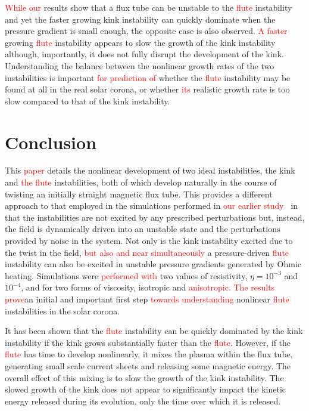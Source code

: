 \documentclass[12pt]{article}
\newcommand{\rs}[2]{\textcolor{red}{#2}}
\begin{document}
\rs{These}{While our} results show that a flux tube can be unstable to
the \rs{fluting}{flute} instability and yet the faster growing kink
instability can quickly dominate when the pressure gradient is small
enough\rs{. However}{}, the opposite case is also observed\rs{,
  where}{. A faster} growing \rs{fluting}{flute} instability appears to slow the growth of
the kink instability although, importantly, it does not fully disrupt
the development of the kink. Understanding the balance between the
nonlinear growth rates of the two instabilities is important \rs{in
understanding}{for prediction of} whether the \rs{fluting}{flute} instability may be found
at all in the real solar corona, or whether \rs{a}{its} realistic growth rate is
too slow compared to that of the kink instability. 

\section{Conclusion}

This \rs{chapter}{paper} details the nonlinear development of two
ideal instabilities, the kink and \rs{}{the} \rs{fluting}{flute} instabilities,
both of which develop naturally in the course of twisting an initially
straight magnetic flux tube. This provides a different approach to
that employed in the simulations performed in \rs{chapter}{our earlier
  study}~\cite{quinnEffectAnisotropicViscosity2020a} in that the
instabilities are not excited by any prescribed perturbations but,
instead, the field is dynamically driven into an unstable state and
the perturbations provided by noise in the system. Not only is the
kink instability excited due to the twist in the field, \rs{}{but also
and near simultaneously} a pressure-driven \rs{fluting}{flute}
instability can also be excited in unstable pressure gradients
generated by Ohmic heating. Simulations 
were \rs{run}{performed} \rs{over}{with} two values of resistivity,
$\eta=10^{-3}$ and $10^{-4}$, and for two forms of viscosity, isotropic and
\rs{switching}{anisotropic}\rs{, providing}{. The results prove}an
initial and important first step \rs{into the simulation of}{towards
understanding} nonlinear \rs{fluting}{flute} instabilities in the
solar corona.  

It has been shown that the \rs{fluting}{flute} instability can be quickly dominated by the kink instability if the kink grows substantially faster than the \rs{fluting}{flute}. However, if the \rs{fluting}{flute} has time to develop nonlinearly, it mixes the plasma within the flux tube, generating small scale current sheets and releasing some magnetic energy. The overall effect of this mixing is to slow the growth of the kink instability. The slowed growth of the kink does not appear to significantly impact the kinetic energy released during its evolution, only the time over which it is released. 
\end{document}
